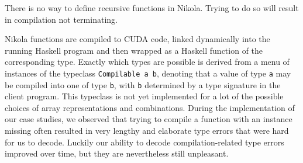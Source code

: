There is no way to define recursive functions in Nikola. Trying to do so
will result in compilation not terminating.

Nikola functions are compiled to CUDA code, linked dynamically into
the running Haskell program and then wrapped as a Haskell function of
the corresponding type.  Exactly which types are possible is derived
from a menu of instances of the typeclass \texttt{Compilable a b},
denoting that a value of type \texttt{a} may be compiled into one of
type \texttt{b}, with \texttt{b} determined by a type signature in the
client program. This typeclass is not yet implemented for a lot of the
possible choices of array representations and combinations. During the
implementation of our case studies, we observed that trying to compile
a function with an instance missing often resulted in very lengthy and
elaborate type errors that were hard for us to decode. Luckily our
ability to decode compilation-related type errors improved over time,
but they are nevertheless still unpleasant.


